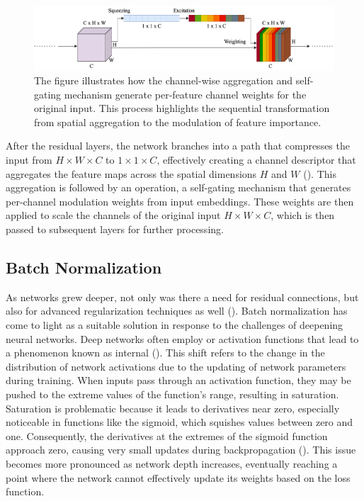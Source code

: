 \bigskip

\begin{figure}[htbp]
    \centering
    \includegraphics[width=1\linewidth]{images/methods_mono/se_block/se_layer.png}
    \captionsetup{justification=justified, singlelinecheck=false, width=1\linewidth, labelfont=bf} 
    \caption[]{The figure illustrates how the channel-wise aggregation and self-gating mechanism generate per-feature channel weights for the original input. This process highlights the sequential transformation from spatial aggregation to the modulation of feature importance.}
    \label{fig:seop}
\end{figure}

\noindent After the residual layers, the network branches into a  path that compresses the input from $H\times W\times C$ to $1\times 1\times C$, effectively creating a channel descriptor that aggregates the feature maps across the spatial dimensions $H$ and $W$ (\textcolor{deepblue}{\cite{hu2017squeezeandexcitation}}). This aggregation is followed by an  operation, a self-gating mechanism that generates per-channel modulation weights from input embeddings. These weights are then applied to scale the channels of the original input $H\times W\times C$, which is then passed to subsequent layers for further processing.

\subsection{Batch Normalization} \label{subsec:batchnorm}

\noindent As networks grew deeper, not only was there a need for residual connections, but also for advanced regularization techniques as well (\cite{TIAN2022146}). Batch normalization has come to light as a suitable solution in response to the challenges of deepening neural networks. Deep networks often employ  or activation functions that lead to a phenomenon known as internal  (\cite{ioffe2015batch}). This shift refers to the change in the distribution of network activations due to the updating of network parameters during training. When inputs pass through an activation function, they may be pushed to the extreme values of the function’s range, resulting in saturation. Saturation is problematic because it leads to derivatives near zero, especially noticeable in functions like the sigmoid, which squishes values between zero and one. Consequently, the derivatives at the extremes of the sigmoid function approach zero, causing very small updates during backpropagation (\cite{7376778}). This issue becomes more pronounced as network depth increases, eventually reaching a point where the network cannot effectively update its weights based on the loss function.

